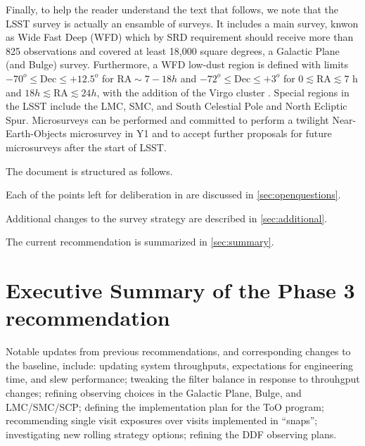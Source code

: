 Finally, to help the reader understand the text that follows, we note that the LSST survey is actually an ensamble of surveys. It includes a main survey, knwon as Wide Fast Deep (WFD) which by SRD requirement should receive more than 825 observations and covered at least 18,000 square degrees, a Galactic Plane (and Bulge) survey. Furthermore, a WFD low-dust region is defined with limits $-70^o \leq \mathrm{Dec} \leq +12.5^o$ for 
$\mathrm{RA} \sim   7-18 h$ and $-72^o \leq \mathrm{Dec}\leq +3^o$
for $0 \lesssim \mathrm{RA} \lesssim 7$ h and $18 h \lesssim \mathrm{RA} \lesssim 24 h$, with the addition of the Virgo cluster .  Special regions in the LSST include the LMC, SMC, and South Celestial Pole and North Ecliptic Spur. Microsurveys can be performed and  committed to perform a twilight Near-Earth-Objects microsurvey in Y1 and to accept further proposals for future microsurveys after the start of LSST.

The document is structured as follows.


Each of the points left for deliberation in   are discussed in \autoref{sec:openquestions}. 

Additional changes to the survey strategy are described in \autoref{sec:additional}. 

The current recommendation is summarized in \autoref{sec:summary}.


\section{Executive Summary of the Phase 3 recommendation}

Notable updates from previous recommendations, and corresponding changes to the baseline, include: updating system throughputs,  expectations for engineering time, and slew performance; tweaking the filter balance in response to throuhgput changes; refining observing choices in the Galactic Plane, Bulge, and LMC/SMC/SCP; defining the implementation plan for the ToO program; recommending single visit exposures over visits implemented in ``snaps''; investigating new rolling strategy options; refining the DDF observing plans.

